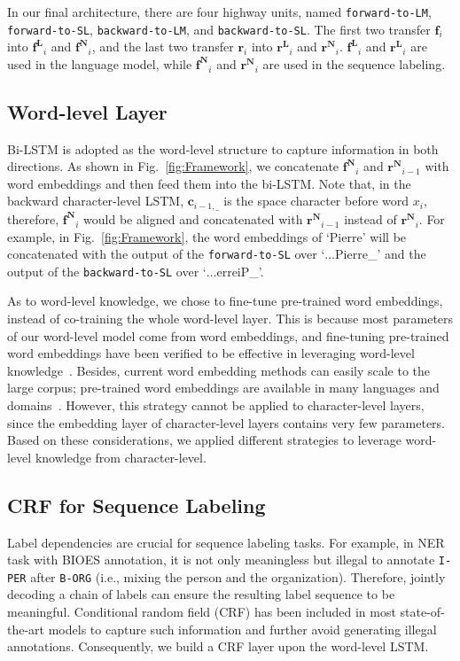 \documentclass[letterpaper]{article} %
\def \myspace {\_}
\def \c {\mathbf{c}}
\def \f {\mathbf{f}}
\def \r {\mathbf{r}}
\def \fl {\mathbf{f^{L}}}
\def \fw {\mathbf{f^{N}}}
\def \rl {\mathbf{r^{L}}}
\def \rw {\mathbf{r^{N}}}
\begin{document}
In our final architecture, there are four highway units, named \texttt{forward-to-LM}, \texttt{forward-to-SL}, \texttt{backward-to-LM}, and \texttt{backward-to-SL}.
The first two transfer $\f_i$ into $\fl_i$ and $\fw_i$, and the last two transfer $\r_i$ into $\rl_i$ and $\rw_i$.
$\fl_i$ and $\rl_i$ are used in the language model, while $\fw_i$ and $\rw_i$ are used in the sequence labeling.

\subsection{Word-level Layer}

Bi-LSTM is adopted as the word-level structure to capture information in both directions.
As shown in Fig.~\ref{fig:Framework}, we concatenate $\fw_i$ and $\rw_{i-1}$ with word embeddings and then feed them into the bi-LSTM.
Note that, in the backward character-level LSTM, $\c_{i-1, \myspace}$ is the space character before word $x_{i}$, therefore, $\fw_i$ would be aligned and concatenated with $\rw_{i-1}$ instead of $\rw_{i}$.
For example, in Fig.~\ref{fig:Framework}, the word embeddings of `Pierre' will be concatenated with the output of the \texttt{forward-to-SL} over `$\ldots$Pierre\myspace' and the output of the \texttt{backward-to-SL} over `$\ldots$erreiP\myspace'.

As to word-level knowledge, we chose to fine-tune pre-trained word embeddings, instead of co-training the whole word-level layer.
This is because most parameters of our word-level model come from word embeddings, and fine-tuning pre-trained word embeddings have been verified to be effective in leveraging word-level knowledge~\cite{ma-hovy:2016:P16-1}.
Besides, current word embedding methods can easily scale to the large corpus; pre-trained word embeddings are available in many languages and domains~\cite{fernandezvecshare}.
However, this strategy cannot be applied to character-level layers, since the embedding layer of character-level layers contains very few parameters.
Based on these considerations, we applied different strategies to leverage word-level knowledge from character-level.

\subsection{CRF for Sequence Labeling}

Label dependencies are crucial for sequence labeling tasks.
For example, in NER task with BIOES annotation, it is not only meaningless but illegal to annotate \texttt{I-PER} after \texttt{B-ORG} (i.e., mixing the person and the organization).
Therefore, jointly decoding a chain of labels can ensure the resulting label sequence to be meaningful.
Conditional random field (CRF) has been included in most state-of-the-art models to capture such information and further avoid generating illegal annotations.
Consequently, we build a CRF layer upon the word-level LSTM.
\end{document}
